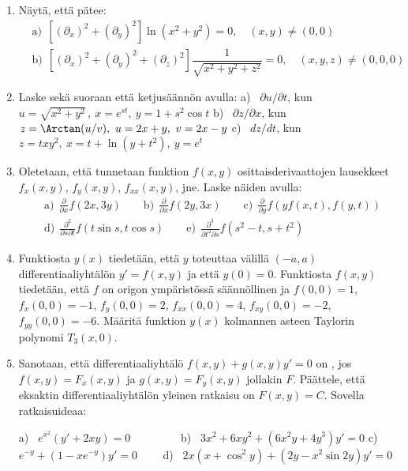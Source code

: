 \begin{enumerate}
\item
Näytä, että pätee:
\begin{align*}
&\text{a)}\ \ \left[(\partial_x)^2+(\partial_y)^2\right] \ln(x^2+y^2)=0, \quad (x,y)\neq(0,0) \\
&\text{b)}\ \ \left[(\partial_x)^2+(\partial_y)^2+(\partial_z)^2\right] 
                                     \dfrac{1}{\sqrt{x^2+y^2+z^2}}=0, \quad (x,y,z)\neq(0,0,0)
\end{align*}

\item
Laske sekä suoraan että ketjusäännön avulla: \vspace{1mm}\newline
a) \ $\partial u/\partial t$, kun $u=\sqrt{x^2+y^2}\,,\ x=e^{st},\ y=1+s^2\cos t$ \newline
b) \ $\partial z/\partial x$, kun $z=\Arctan(u/v),\ u=2x+y,\ v=2x-y$ \newline
c) \ $d z/d t$, kun $z=txy^2,\ x=t+\ln(y+t^2),\ y=e^t$

\item
Oletetaan, että tunnetaan funktion $f(x,y)$ osittaisderivaattojen lausekkeet $f_x(x,y)$,
$f_y(x,y)$, $f_{xx}(x,y)$, jne. Laske näiden avulla:
\begin{align*}
&\text{a)}\ \ \frac{\partial}{\partial x} f(2x,3y) \qquad
 \text{b)}\ \ \frac{\partial}{\partial x} f(2y,3x) \qquad
 \text{c)}\ \ \frac{\partial}{\partial y} f(yf(x,t),f(y,t)) \\
&\text{d)}\ \ \frac{\partial^2}{\partial s\partial t} f(t\sin s,t\cos s) \qquad
 \text{e)}\ \ \frac{\partial^3}{\partial t^2\partial s} f(s^2-t,s+t^2)
\end{align*}

\item
Funktiosta $y(x)$ tiedetään, että $y$ toteuttaa välillä $(-a,a)$ differentiaaliyhtälön
$y'=f(x,y)$ ja että $y(0)=0$. Funktiosta $f(x,y)$ tiedetään, että $f$ on origon ympäristössä
säännöllinen ja $f(0,0) = 1$, $f_x(0,0) = -1$, $f_y(0,0) = 2$, $f_{xx}(0,0) = 4$,
$f_{xy}(0,0) = -2$, $f_{yy}(0,0) = -6$. Määritä funktion $y(x)$ kolmannen asteen Taylorin
polynomi $T_3(x,0)$.

\item {}
Sanotaan, että differentiaaliyhtälö $f(x,y)+g(x,y)y'=0$ on , jos $f(x,y)=F_x(x,y)$
ja $g(x,y)=F_y(x,y)$ jollakin $F$. Päättele, että eksaktin differentiaaliyhtälön yleinen
ratkaisu on $F(x,y)=C$. Sovella ratkaisuideaa:

a) \ $e^{x^2}(y'+2xy)=0 \qquad\qquad\ $
b) \ $3x^2+6xy^2+(6x^2y+4y^3)y'=0$ \newline
c) \ $ e^{-y}+(1-xe^{-y})y'=0 \qquad$
d) \ $2x(x+\cos^2y)+(2y-x^2\sin 2y)y'=0$


\end{enumerate}

